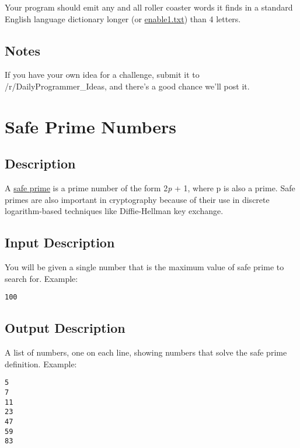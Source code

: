 Your program should emit any and all roller coaster words it finds in a
standard English language dictionary longer (or
\href{https://github.com/dolph/dictionary/blob/master/enable1.txt}{enable1.txt})
than 4 letters.

\subsection*{Notes}\label{notes-1}

If you have your own idea for a challenge, submit it to
/r/DailyProgrammer\_Ideas, and there's a good chance we'll post it.


\section{Safe Prime Numbers}

\subsection*{Description}\label{description-39}

A \href{https://en.wikipedia.org/wiki/Safe_prime}{safe prime} is a prime
number of the form 2\emph{p} + 1, where p is also a prime. Safe primes
are also important in cryptography because of their use in discrete
logarithm-based techniques like Diffie-Hellman key exchange.

\subsection*{Input Description}\label{input-description-26}

You will be given a single number that is the maximum value of safe
prime to search for. Example:

\begin{lstlisting}
100
\end{lstlisting}

\subsection*{Output Description}\label{output-description-28}

A list of numbers, one on each line, showing numbers that solve the safe
prime definition. Example:

\begin{lstlisting}
5
7
11
23
47
59
83
\end{lstlisting}

